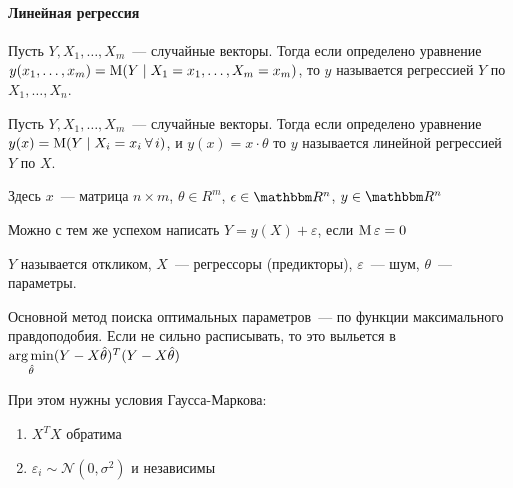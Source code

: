 \documentclass[12pt,timbord]{../../../notes}
\begin{document}
\paragraph{Линейная регрессия}
\label{par:stat::regr}


\begin{defn}[Регрессия]\label{defn:stat::regr::reg}
  Пусть $Y, X_1, \dotsc, X_m$~--- случайные векторы. 
  Тогда если определено уравнение $y(x_1, \dotsc, x_m) = \operatorname{M} (Y \mid X_1 = x_1, \dotsc, X_m =
  x_m)$,  то $y$ называется регрессией $Y$ по $X_1, \dotsc, X_n$.
\end{defn}

\begin{defn}\label{defn:stat::regr::lin}
  Пусть $Y, X_1, \dotsc, X_m$~--- случайные векторы. 
  Тогда если определено уравнение $y(x) = \operatorname{M} (Y \mid X_i =  x_i \:\forall\, i)$, 
  и $y(x) = x\cdot\theta $ то $y$ называется линейной регрессией $Y$ по $X$.

  Здесь $x$~--- матрица $n\times m$, $\theta\in R^m$, $\epsilon\in \R^n$, $y\in \R^n$
\end{defn}
\begin{rem}\label{rem:stat::regr::funran}
  Можно с тем же успехом написать $Y = y(X)+ \varepsilon$, если $\operatorname{M} \varepsilon =0$
\end{rem}

\begin{defn}\label{defn:stat::reg::memb}
  $Y$ называется откликом, $X$~--- регрессоры (предикторы), $\varepsilon$~--- шум, $\theta$~---
  параметры.
\end{defn}

Основной метод поиска оптимальных параметров~--- по  функции максимального правдоподобия. Если не
сильно расписывать, то это выльется в $\operatorname*{arg\,min}\limits_{\hat\theta} (Y-X\hat\theta)^T(Y-X\hat\theta)$

При этом нужны условия Гаусса-Маркова:
\begin{enumerate}
  \item $X^T X$ обратима
  \item $\varepsilon_i \sim \mathcal N(0,\sigma^2)$ и независимы
\end{enumerate}
\end{document}

